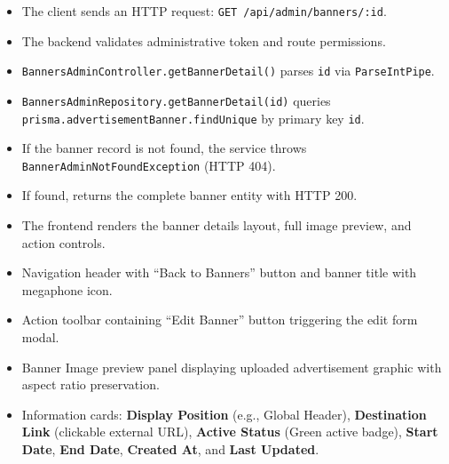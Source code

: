 \begin{itemize}[leftmargin=1.6em,topsep=3pt,itemsep=2pt,parsep=0pt,label=$\bullet$]
    \item The client sends an HTTP request: \texttt{GET /api/admin/banners/:id}.
    \item The backend validates administrative token and route permissions.
    \item \texttt{Banners\allowbreak{}Admin\allowbreak{}Controller.\allowbreak{}get\allowbreak{}Banner\allowbreak{}Detail()} parses \texttt{id} via \texttt{ParseIntPipe}.
    \item \texttt{Banners\allowbreak{}Admin\allowbreak{}Repository.\allowbreak{}get\allowbreak{}Banner\allowbreak{}Detail(\allowbreak{}id)} queries \texttt{prisma.\allowbreak{}advertisement\allowbreak{}Banner.\allowbreak{}findUnique} by primary key \texttt{id}.
    \item If the banner record is not found, the service throws \texttt{Banner\allowbreak{}Admin\allowbreak{}Not\allowbreak{}Found\allowbreak{}Exception} (HTTP 404).
    \item If found, returns the complete banner entity with HTTP 200.
    \item The frontend renders the banner details layout, full image preview, and action controls.
\end{itemize}

\begin{itemize}[leftmargin=1.6em,topsep=3pt,itemsep=2pt,parsep=0pt,label=$\bullet$]
    \item Navigation header with ``Back to Banners'' button and banner title with megaphone icon.
    \item Action toolbar containing ``Edit Banner'' button triggering the edit form modal.
    \item Banner Image preview panel displaying uploaded advertisement graphic with aspect ratio preservation.
    \item Information cards: \textbf{Display Position} (e.g., Global Header), \textbf{Destination Link} (clickable external URL), \textbf{Active Status} (Green active badge), \textbf{Start Date}, \textbf{End Date}, \textbf{Created At}, and \textbf{Last Updated}.
\end{itemize}


